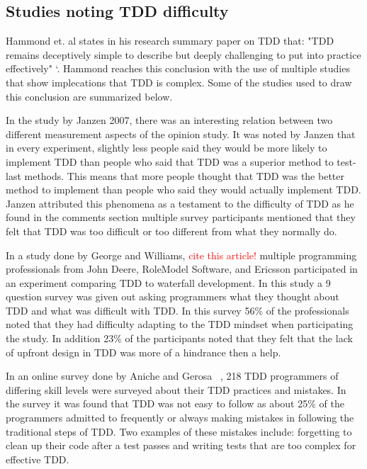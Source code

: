 \documentclass{sig-alternate}
\newcommand{\mycomment}[1]{\textcolor{red}{#1}}
\begin{document}
\subsection{Studies noting TDD difficulty}
Hammond et. al states in his research summary paper on TDD that: "TDD remains deceptively simple to describe but deeply challenging to put into practice effectively" `\cite{Hammond:2012}.  Hammond reaches this conclusion with the use of multiple studies that show implecations that TDD is complex.  Some of the studies used to draw this conclusion are summarized below.

In the study by Janzen 2007, there was an interesting relation between two different measurement aspects of the opinion study.  It was noted by Janzen that in every experiment, slightly less people said they would be more likely to implement TDD than people who said that TDD was a superior method to test-last methods. This means that more people thought that TDD was the better method to implement than  people who said they would actually implement TDD.  Janzen attributed this phenomena as a testament to the difficulty of TDD as he found in the comments section multiple survey participants mentioned that they felt that TDD was too difficult or too different from what they normally do.

In a study done by George and Williams,  \mycomment{cite this article!} multiple programming professionals from John Deere, RoleModel Software, and Ericsson participated in an experiment comparing TDD to waterfall development.  In this study a 9 question survey was given out asking programmers what they thought about TDD and what was difficult with TDD.  In this survey 56\% of the professionals noted that they had difficulty adapting to the TDD mindset when participating the study.  In addition 23\% of the participants noted that they felt that the lack of upfront design in TDD was more of a hindrance then a help. 

In an online survey done by Aniche and Gerosa ~\cite{Aniche:2010}, 218 TDD programmers of differing skill levels were surveyed about their TDD practices and mistakes.  In the survey it was found that TDD was not easy to follow as about 25\% of the programmers admitted to frequently or always making mistakes in following the traditional steps of TDD.  Two examples of these mistakes include: forgetting to clean up their code after a test passes and writing tests that are too complex for effective TDD.
 
\end{document}
